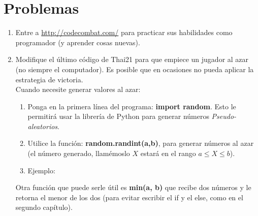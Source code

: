 \section{Problemas}
\begin{Exercise}[title={Calentamiento}]	
	\begin{enumerate}
		\item Entre a \url{http://codecombat.com/} para practicar sus habilidades como programador (y aprender cosas nuevas).
		
		\item Modifique el último código de Thai21 para que empiece un jugador al azar (no siempre el computador). Es posible que en ocasiones no pueda aplicar la estrategia de victoria. \\
		
		Cuando necesite generar valores al azar:
		
		\begin{enumerate}
			\item Ponga en la primera línea del programa: \textbf{import random}. Esto le permitirá usar la librería de Python para generar números \emph{Pseudo-aleatorios}.
			
			\item Utilice la función:  \textbf{random.randint(a,b)}, para generar números al azar (el número generado, llamémoslo $X$ estará en el rango $a \leq X \leq b$). 
			
			\item Ejemplo:
			
		\end{enumerate}
		
		Otra función que puede serle útil es \textbf{min(a, b)} que recibe dos números y le retorna el menor de los dos (para evitar escribir el if y el else, como en el segundo capítulo).
	\end{enumerate}
\end{Exercise}
\begin{Answer}	
	
	\newpage
\end{Answer}

\newpage


